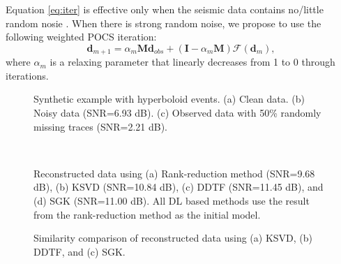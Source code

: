 Equation \ref{eq:iter} is effective only when the seismic data contains no/little random nosie \cite{shuwei2016cs}. When there is strong random noise, we propose to use the following weighted POCS iteration:
\begin{equation}
\label{eq:iter2}
\mathbf{d}_{m+1} =\alpha_m\mathbf{M}\mathbf{d}_{obs} +  (\mathbf{I}-\alpha_m\mathbf{M})  \mathcal{F}(\mathbf{d}_m),
\end{equation}
where $\alpha_m$ is a relaxing parameter that linearly decreases from 1 to 0 through iterations.

\begin{figure}[htb!]
\centering
{}
\caption{Synthetic example with hyperboloid events. (a) Clean data. (b) Noisy data (SNR=6.93 dB). (c) Observed data with 50\% randomly missing traces (SNR=2.21 dB).}
\label{fig:hyper-clean,hyper-noisy,hyper-obs}
\end{figure}


\begin{figure}[htb!]
\centering
{}
\\
\caption{Reconstructed data using (a) Rank-reduction method (SNR=9.68 dB), (b) KSVD (SNR=10.84 dB), (c) DDTF (SNR=11.45 dB), and (d) SGK (SNR=11.00 dB). All DL based methods use the result from the rank-reduction method as the initial model.}
\label{fig:hyper-mssa,hyper-ksvd,hyper-ddtf,hyper-sgk}
\end{figure}


\begin{figure}[htb!]
\centering
{}
\caption{Similarity comparison of reconstructed data using (a) KSVD, (b) DDTF, and (c) SGK.}
\label{fig:hyper-ksvd-simi,hyper-ddtf-simi,hyper-sgk-simi}
\end{figure}


